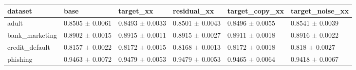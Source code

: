 \begin{tabular}{llllll}
\toprule
dataset & base & target\_xx & residual\_xx & target\_copy\_xx & target\_noise\_xx \\
\midrule
adult & 0.8505 $\pm$ 0.0061 & 0.8493 $\pm$ 0.0033 & 0.8501 $\pm$ 0.0043 & 0.8496 $\pm$ 0.0055 & 0.8541 $\pm$ 0.0039 \\
bank\_marketing & 0.8902 $\pm$ 0.0015 & 0.8915 $\pm$ 0.0011 & 0.8915 $\pm$ 0.0027 & 0.8911 $\pm$ 0.0018 & 0.8916 $\pm$ 0.0022 \\
credit\_default & 0.8157 $\pm$ 0.0022 & 0.8172 $\pm$ 0.0015 & 0.8168 $\pm$ 0.0013 & 0.8172 $\pm$ 0.0018 & 0.818 $\pm$ 0.0027 \\
phishing & 0.9463 $\pm$ 0.0072 & 0.9479 $\pm$ 0.0053 & 0.9479 $\pm$ 0.0053 & 0.9465 $\pm$ 0.0064 & 0.9418 $\pm$ 0.0067 \\
\bottomrule
\end{tabular}
